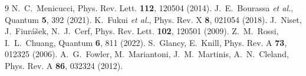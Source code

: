 \documentclass[aps,prxquantum,reprint,superscriptaddress,nofootinbib]{revtex4-2}
\begin{document}
\begin{thebibliography}{9}
 N.~C.~Menicucci, Phys. Rev. Lett. \textbf{112},
120504 (2014).
 J.~E.~Bourassa \emph{et al.}, Quantum \textbf{5}, 392
(2021).
 K.~Fukui \emph{et al.}, Phys. Rev. X \textbf{8}, 021054
(2018).
 J.~Niset, J.~Fiur\'a\v{s}ek, N.~J.~Cerf, Phys. Rev. Lett.
\textbf{102}, 120501 (2009).
 Z.~M.~Rossi, I.~L.~Chuang, Quantum \textbf{6}, 811 (2022).
 S.~Glancy, E.~Knill, Phys. Rev. A \textbf{73}, 012325
(2006).
 A.~G.~Fowler, M.~Mariantoni, J.~M.~Martinis,
A.~N.~Cleland, Phys. Rev. A \textbf{86}, 032324 (2012).
\end{thebibliography}
\end{document}
